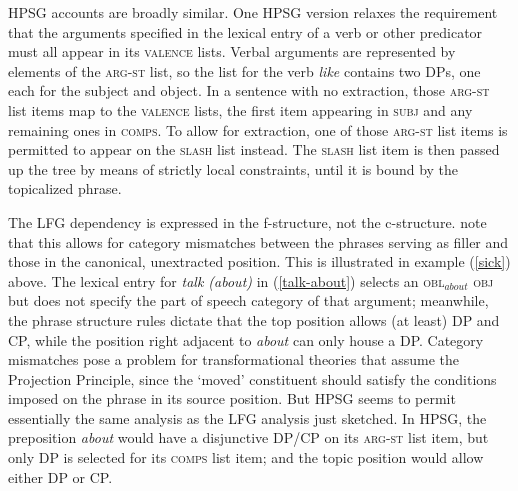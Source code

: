 \ea
\label{ann} 
{
}
\z

\noindent
HPSG accounts are broadly similar.  One HPSG version relaxes the requirement that the arguments specified in the lexical entry of a verb or other predicator must all appear in its \textsc{valence} lists.   Verbal arguments are represented by elements of the \textsc{arg-st} list, so the list for the verb \textit{like} contains two DPs, one each for the subject and object.  In a sentence with no extraction, those \textsc{arg-st} list items map to the \textsc{valence} lists, the  first item appearing in \textsc{subj} and any remaining ones in \textsc{comps}.  To allow for extraction, one of those \textsc{arg-st} list items is permitted to appear on the \textsc{slash} list instead.  The \textsc{slash} list item is then passed up the tree by means of strictly local constraints, until it is bound by the topicalized phrase.   

The LFG dependency is expressed in the f-structure, not the c-structure.  \citet[Chapter 2]{BATW2015a} note that this allows for category mismatches between the phrases serving as filler and those in the canonical, unextracted position.  This is illustrated in example (\ref{sick}) above.  The lexical entry for \textit{talk (about)} in (\ref{talk-about}) selects an \textsc{obl}$_{about}$ \textsc{obj} but does not specify the part of speech category of that argument; meanwhile, the phrase structure rules dictate that the top position allows (at least) DP and CP, while the position right adjacent to \textit{about} can only house a DP.   Category mismatches pose a problem for transformational theories that assume the Projection Principle, since the `moved' constituent should satisfy the conditions imposed on the phrase in its source position.  But HPSG seems to permit essentially the same analysis as the LFG analysis just sketched.   In HPSG, the preposition \textit{about} would have a disjunctive DP/CP on its \textsc{arg-st} list item, but only DP is selected for its \textsc{comps} list item; and the topic position would allow either DP or CP.  

